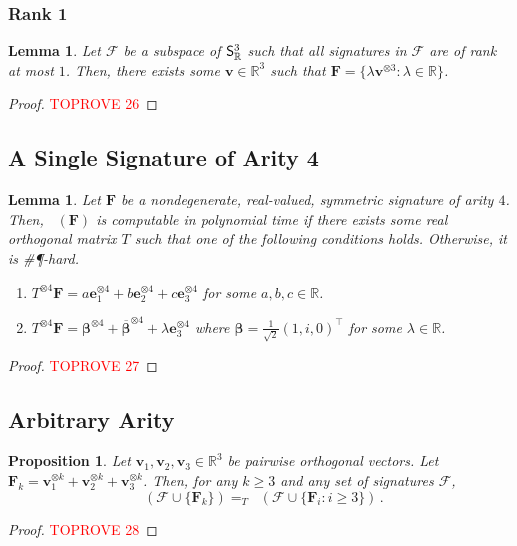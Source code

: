 \documentclass[11pt]{article}
\newtheorem{lemma}[theorem]{Lemma}
\newtheorem{proposition}[theorem]{Proposition}
\DeclareMathOperator{\holts}{Holant^*_3}
\newcommand{\sph}{\#\P-hard\xspace}
\newcommand{\teh}{^{\otimes 3}}
\newcommand{\transpose}{^\intercal}
\begin{document}
\subsubsection{Rank 1}
\begin{lemma}\label{lem:subspace-rank-1}
Let $\mathscr{F}$ be a subspace of $\mathsf{S}^3_{\mathbb{R}}$ such that all signatures in $\mathscr{F}$ are of rank at most $1$.
Then, there exists some $\mathbf{v} \in \mathbb{R}^3$ such that $\mathbf{F} = \{\lambda \mathbf{v}\teh : \lambda \in \mathbb{R}\}$.
\end{lemma}
\begin{proof}\textcolor{red}{TOPROVE 26}\end{proof}

\subsection{A Single Signature of Arity 4}
\begin{lemma}\label{lem:dichotomy-single-arity-4}
Let $\mathbf{F}$ be a nondegenerate, real-valued, symmetric signature of arity $4$.
Then, $\holts(\mathbf{F})$ is computable in polynomial time if there exists some real orthogonal matrix $T$ such that one of the following conditions holds.
Otherwise, it is \sph.
\begin{enumerate}
  \item $T^{\otimes 4} \mathbf{F} = a \mathbf{e}_1^{\otimes 4} + b \mathbf{e}_2^{\otimes 4} + c \mathbf{e}_3^{\otimes 4}$ for some $a, b, c \in \mathbb{R}$.
  \item $T^{\otimes 4}\mathbf{F} = \boldsymbol{\beta}^{\otimes 4} + \overline{\boldsymbol{\beta}}^{\otimes 4} + \lambda \mathbf{e}_3^{\otimes 4}$ where $\boldsymbol{\beta} = \frac{1}{\sqrt{2}}(1, i, 0)\transpose$ for some $\lambda \in \mathbb{R}$.
\end{enumerate}
\end{lemma} 
\begin{proof}\textcolor{red}{TOPROVE 27}\end{proof}

\subsection{Arbitrary Arity}\label{subsec:arbitrary-arity}
\begin{proposition}\label{prop:geneq-get-all-arity}
  Let $\mathbf{v}_1, \mathbf{v}_2, \mathbf{v}_3 \in \mathbb{R}^3$ be pairwise orthogonal vectors.
  Let $\mathbf{F}_k = \mathbf{v}_1^{\otimes k} + \mathbf{v}_2^{\otimes k}  + \mathbf{v}_3^{\otimes k}$.
  Then, for any $k \ge 3$ and any set of signatures $\mathscr{F}$,
  \[
    \holts(\mathscr{F} \cup \{\mathbf{F}_k\}) =_T \holts(\mathscr{F} \cup \{\mathbf{F}_i : i \ge 3\}) \, .
  \]
\end{proposition}
\begin{proof}\textcolor{red}{TOPROVE 28}\end{proof}
\end{document}
